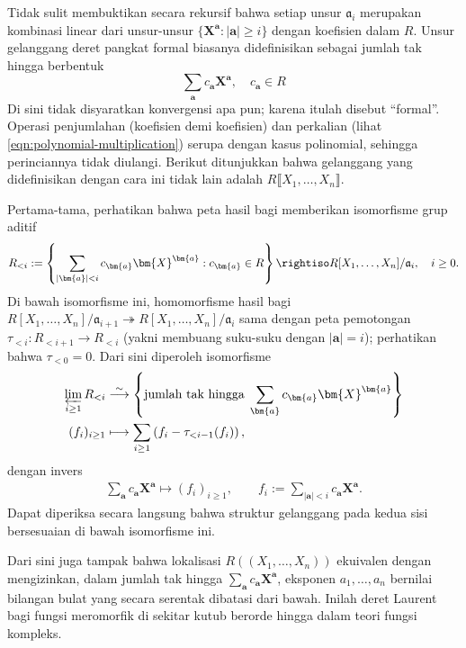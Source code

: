 \begin{remark}
	Tidak sulit membuktikan secara rekursif bahwa setiap unsur $\mathfrak{a}_i$ merupakan kombinasi linear dari unsur-unsur $\{ \bm{X}^{\bm{a}} : |\bm{a}| \geq i \}$ dengan koefisien dalam $R$. Unsur gelanggang deret pangkat formal biasanya didefinisikan sebagai jumlah tak hingga berbentuk
	\[ \sum_{\bm{a}} c_{\bm{a}} \bm{X}^{\bm{a}}, \quad c_{\bm{a}} \in R \]
	Di sini tidak disyaratkan konvergensi apa pun; karena itulah disebut ``formal''. Operasi penjumlahan (koefisien demi koefisien) dan perkalian (lihat \eqref{eqn:polynomial-multiplication}) serupa dengan kasus polinomial, sehingga perinciannya tidak diulangi. Berikut ditunjukkan bahwa gelanggang yang didefinisikan dengan cara ini tidak lain adalah $R\llbracket X_1, \ldots, X_n \rrbracket$.

	Pertama-tama, perhatikan bahwa peta hasil bagi memberikan isomorfisme grup aditif
	\[ R_{<i} := \left\{\sum_{|\bm{a}|< i} c_{\bm{a}} \bm{X}^{\bm{a}} : c_{\bm{a}} \in R \right\} \rightiso R[X_1, \ldots, X_n]/\mathfrak{a}_i, \quad i \geq 0. \]
	Di bawah isomorfisme ini, homomorfisme hasil bagi $R[X_1, \ldots, X_n]/\mathfrak{a}_{i+1} \twoheadrightarrow R[X_1, \ldots, X_n]/\mathfrak{a}_i$ sama dengan peta pemotongan $\tau_{<i}: R_{<i+1} \to R_{<i}$ (yakni membuang suku-suku dengan $|\bm{a}| = i$); perhatikan bahwa $\tau_{<0} = 0$. Dari sini diperoleh isomorfisme
	\begin{align*}
		\varprojlim_{i \geq 1} R_{<i} & \stackrel{\sim}{\longrightarrow} \left\{ \text{jumlah tak hingga}\; \sum_{\bm{a}} c_{\bm{a}} \bm{X}^{\bm{a}}  \right\} \\
		(f_i)_{i \geq 1} & \longmapsto \sum_{i \geq 1} \left( f_i - \tau_{<i-1}(f_i) \right),
	\end{align*}
	dengan invers
	\begin{gather*}
		\sum_{\bm{a}} c_{\bm{a}} \bm{X}^{\bm{a}} \longmapsto (f_i)_{i \geq 1}, \qquad f_i := \sum_{|\bm{a}| < i} c_{\bm{a}} \bm{X}^{\bm{a}}.
	\end{gather*}
	Dapat diperiksa secara langsung bahwa struktur gelanggang pada kedua sisi bersesuaian di bawah isomorfisme ini.

	Dari sini juga tampak bahwa lokalisasi $R(\!(X_1, \ldots, X_n)\!)$ ekuivalen dengan mengizinkan, dalam jumlah tak hingga $\sum_{\bm{a}} c_{\bm{a}} \bm{X}^{\bm{a}}$, eksponen $a_1, \ldots, a_n$ bernilai bilangan bulat yang secara serentak dibatasi dari bawah. Inilah deret Laurent bagi fungsi meromorfik di sekitar kutub berorde hingga dalam teori fungsi kompleks.
\end{remark}

